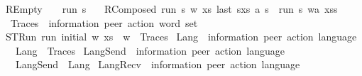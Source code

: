 \begin{isabellebody}
REmpty{\isacharcolon}{\kern0pt}\ \ \ \ {\isachardoublequoteopen}run\ s\ {\isasymepsilon}\ {\isacharparenleft}{\kern0pt}{\isacharbrackleft}{\kern0pt}{\isacharbrackright}{\kern0pt}{\isacharparenright}{\kern0pt}{\isachardoublequoteclose}\ {\isacharbar}{\kern0pt}\isanewline
RComposed{\isacharcolon}{\kern0pt}\ {\isachardoublequoteopen}{\isasymlbrakk}run\ s{}\ w\ xs{\isacharsemicolon}{\kern0pt}\ last\ {\isacharparenleft}{\kern0pt}s{}{\isacharhash}{\kern0pt}xs{\isacharparenright}{\kern0pt}\ {\isasymmidarrow}a{\isasymrightarrow}\ s{\isasymrbrakk}\ {\isasymLongrightarrow}\ run\ s{}\ {\isacharparenleft}{\kern0pt}w{\isasymcdot}{\isacharbrackleft}{\kern0pt}a{\isacharbrackright}{\kern0pt}{\isacharparenright}{\kern0pt}\ {\isacharparenleft}{\kern0pt}xs{\isacharat}{\kern0pt}{\isacharbrackleft}{\kern0pt}s{\isacharbrackright}{\kern0pt}{\isacharparenright}{\kern0pt}{\isachardoublequoteclose}\isanewline
\isanewline
{}\isamarkupfalse%
\ Traces\ {\isacharcolon}{\kern0pt}{\isacharcolon}{\kern0pt}\ {\isachardoublequoteopen}{\isacharparenleft}{\kern0pt}{\isacharprime}{\kern0pt}information{\isacharcomma}{\kern0pt}\ {\isacharprime}{\kern0pt}peer{\isacharparenright}{\kern0pt}\ action\ word\ set{\isachardoublequoteclose}\ \isanewline
STRun{\isacharcolon}{\kern0pt}\ {\isachardoublequoteopen}run\ initial\ w\ xs\ {\isasymLongrightarrow}\ w\ {\isasymin}\ Traces{\isachardoublequoteclose}\isanewline
\isanewline
{}\isamarkupfalse%
\ Lang\ {\isacharcolon}{\kern0pt}{\isacharcolon}{\kern0pt}\ {\isachardoublequoteopen}{\isacharparenleft}{\kern0pt}{\isacharprime}{\kern0pt}information{\isacharcomma}{\kern0pt}\ {\isacharprime}{\kern0pt}peer{\isacharparenright}{\kern0pt}\ action\ language{\isachardoublequoteclose}\ \isanewline
\ \ {\isachardoublequoteopen}Lang\ {\isasymequiv}\ Traces{\isachardoublequoteclose}\isanewline
\isanewline
{}\isamarkupfalse%
\ LangSend\ {\isacharcolon}{\kern0pt}{\isacharcolon}{\kern0pt}\ {\isachardoublequoteopen}{\isacharparenleft}{\kern0pt}{\isacharprime}{\kern0pt}information{\isacharcomma}{\kern0pt}\ {\isacharprime}{\kern0pt}peer{\isacharparenright}{\kern0pt}\ action\ language{\isachardoublequoteclose}\ \isanewline
\ \ {\isachardoublequoteopen}LangSend\ {\isasymequiv}\ Lang{\isasymdownharpoonright}\isactrlsub {\isacharbang}{\kern0pt}{\isachardoublequoteclose}\isanewline
\isanewline
{}\isamarkupfalse%
\ LangRecv\ {\isacharcolon}{\kern0pt}{\isacharcolon}{\kern0pt}\ {\isachardoublequoteopen}{\isacharparenleft}{\kern0pt}{\isacharprime}{\kern0pt}information{\isacharcomma}{\kern0pt}\ {\isacharprime}{\kern0pt}peer{\isacharparenright}{\kern0pt}\ action\ language{\isachardoublequoteclose}\ \isanewline

\end{isabellebody}
